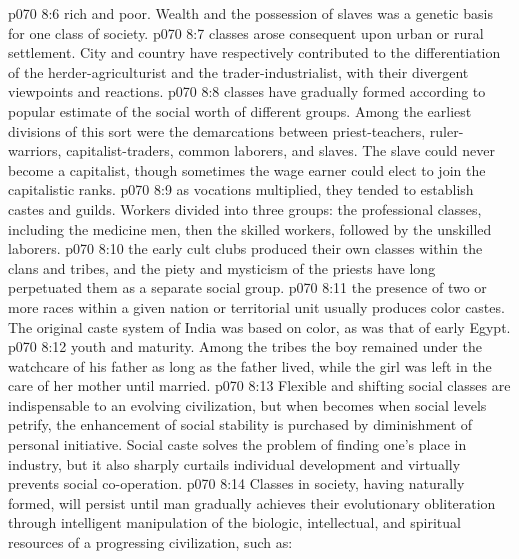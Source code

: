 \vs p070 8:6 \pc {}\bibnobreakspace {} rich and poor. Wealth and the possession of slaves was a genetic basis for one class of society.
\vs p070 8:7 \pc {}\bibnobreakspace {} classes arose consequent upon urban or rural settlement. City and country have respectively contributed to the differentiation of the herder\hyp{}agriculturist and the trader\hyp{}industrialist, with their divergent viewpoints and reactions.
\vs p070 8:8 \pc {}\bibnobreakspace {} classes have gradually formed according to popular estimate of the social worth of different groups. Among the earliest divisions of this sort were the demarcations between priest\hyp{}teachers, ruler\hyp{}warriors, capitalist\hyp{}traders, common laborers, and slaves. The slave could never become a capitalist, though sometimes the wage earner could elect to join the capitalistic ranks.
\vs p070 8:9 \pc {}\bibnobreakspace {} as vocations multiplied, they tended to establish castes and guilds. Workers divided into three groups: the professional classes, including the medicine men, then the skilled workers, followed by the unskilled laborers.
\vs p070 8:10 \pc {}\bibnobreakspace {} the early cult clubs produced their own classes within the clans and tribes, and the piety and mysticism of the priests have long perpetuated them as a separate social group.
\vs p070 8:11 \pc {}\bibnobreakspace {} the presence of two or more races within a given nation or territorial unit usually produces color castes. The original caste system of India was based on color, as was that of early Egypt.
\vs p070 8:12 \pc {}\bibnobreakspace {} youth and maturity. Among the tribes the boy remained under the watchcare of his father as long as the father lived, while the girl was left in the care of her mother until married.
\vs p070 8:13 \pc Flexible and shifting social classes are indispensable to an evolving civilization, but when  becomes  when social levels petrify, the enhancement of social stability is purchased by diminishment of personal initiative. Social caste solves the problem of finding one’s place in industry, but it also sharply curtails individual development and virtually prevents social co\hyp{}operation.
\vs p070 8:14 Classes in society, having naturally formed, will persist until man gradually achieves their evolutionary obliteration through intelligent manipulation of the biologic, intellectual, and spiritual resources of a progressing civilization, such as:
